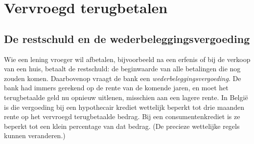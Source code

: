 
\begin{oefeningen}
\end{oefeningen}

\section{Vervroegd terugbetalen}

\subsection{De restschuld en de wederbeleggingsvergoeding}

Wie een lening vroeger wil afbetalen, bijvoorbeeld na een erfenis of bij de verkoop van een huis, betaalt de restschuld: de beginwaarde van alle betalingen die nog zouden komen. Daarbovenop vraagt de bank een \textit{wederbeleggingsvergoeding}. De bank had immers gerekend op de rente van de komende jaren, en moet het terugbetaalde geld nu opnieuw uitlenen, misschien aan een lagere rente. In België is die vergoeding bij een hypothecair krediet wettelijk beperkt tot drie maanden rente op het vervroegd terugbetaalde bedrag. Bij een consumentenkrediet is ze beperkt tot een klein percentage van dat bedrag. (De precieze wettelijke regels kunnen veranderen.)

